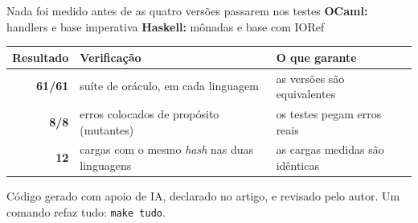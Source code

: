\documentclass[aspectratio=169,10pt]{beamer}
\newcommand{\HL}[1]{\textcolor{emphasis}{#1}}
\newcommand{\oc}[1]{\textcolor{ocamlc}{#1}}
\newcommand{\hs}[1]{\textcolor{haskellc}{#1}}
\begin{document}
\begin{frame}{Nada foi medido antes de as quatro versões passarem nos testes}
  \oc{\textbf{OCaml:}} handlers e base imperativa \qquad \hs{\textbf{Haskell:}} mônadas e base com IORef
  \vspace{6pt}
  \begin{center}
  \begin{tabular}{rll}
    \toprule
    \textbf{Resultado} & \textbf{Verificação} & \textbf{O que garante} \\
    \midrule
    \HL{\textbf{61/61}} & suíte de oráculo, em cada linguagem & as versões são equivalentes \\
    \HL{\textbf{8/8}} & erros colocados de propósito (mutantes) & os testes pegam erros reais \\
    \HL{\textbf{12}} & cargas com o mesmo \emph{hash} nas duas linguagens & as cargas medidas são idênticas \\
    \bottomrule
  \end{tabular}
  \end{center}
  \vspace{6pt}
  Código gerado com apoio de IA, declarado no artigo, e revisado pelo autor. Um comando refaz tudo: \texttt{make tudo}.
\end{frame}
\end{document}
